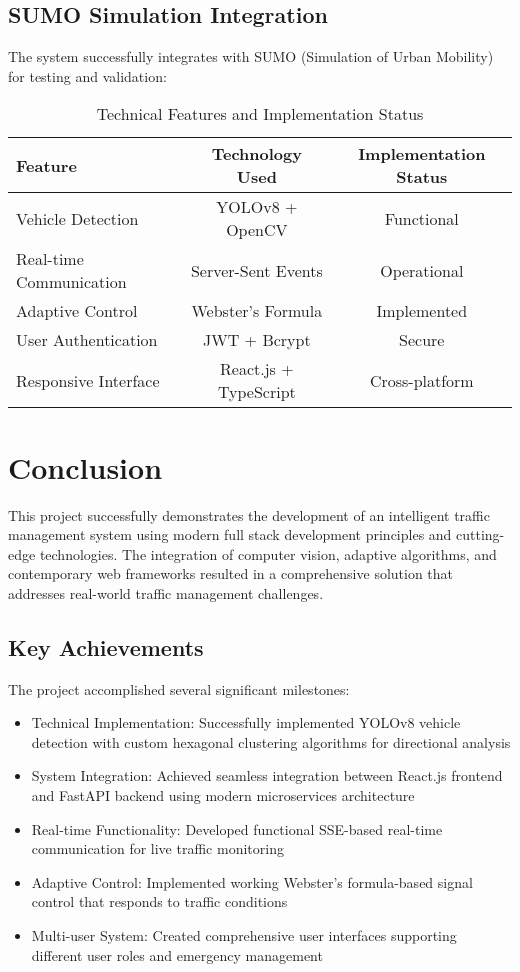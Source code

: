 \documentclass[conference]{IEEEtran}
\begin{document}
\subsection{SUMO Simulation Integration}

The system successfully integrates with SUMO (Simulation of Urban Mobility) for testing and validation:

\begin{table}[H]
\centering
\caption{Technical Features and Implementation Status}
\label{tab:technical_features}
\begin{tabular}{|l|c|c|}
\hline
\textbf{Feature} & \textbf{Technology Used} & \textbf{Implementation Status} \\
\hline
Vehicle Detection & YOLOv8 + OpenCV & Functional \\
Real-time Communication & Server-Sent Events & Operational \\
Adaptive Control & Webster's Formula & Implemented \\
User Authentication & JWT + Bcrypt & Secure \\
Responsive Interface & React.js + TypeScript & Cross-platform \\
\hline
\end{tabular}
\end{table}

\section{Conclusion}

This project successfully demonstrates the development of an intelligent traffic management system using modern full stack development principles and cutting-edge technologies. The integration of computer vision, adaptive algorithms, and contemporary web frameworks resulted in a comprehensive solution that addresses real-world traffic management challenges.

\subsection{Key Achievements}

The project accomplished several significant milestones:

\begin{itemize}
\item Technical Implementation: Successfully implemented YOLOv8 vehicle detection with custom hexagonal clustering algorithms for directional analysis
\item System Integration: Achieved seamless integration between React.js frontend and FastAPI backend using modern microservices architecture
\item Real-time Functionality: Developed functional SSE-based real-time communication for live traffic monitoring
\item Adaptive Control: Implemented working Webster's formula-based signal control that responds to traffic conditions
\item Multi-user System: Created comprehensive user interfaces supporting different user roles and emergency management
\end{itemize}
\end{document}
